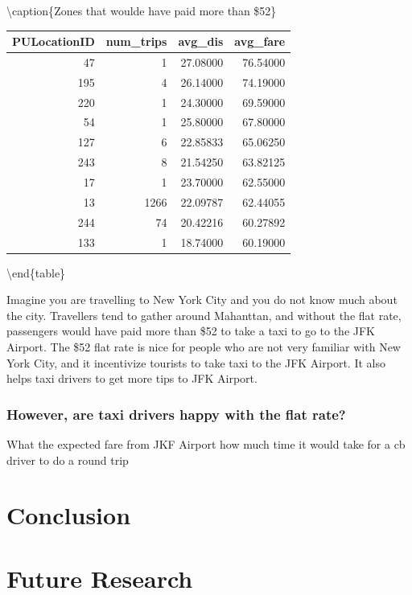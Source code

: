 \documentclass[12pt,twoside]{reedthesis}
\theoremstyle{definition}
\theoremstyle{definition}
\theoremstyle{definition}
\theoremstyle{remark}
\begin{document}
\textbackslash{}caption\{\label{tab:unnamed-chunk-23}Zones that woulde have
paid more than \$52\} \centering
\begin{tabular}[t]{r|r|r|r}
\hline
PULocationID & num\_trips & avg\_dis & avg\_fare\\
\hline
47 & 1 & 27.08000 & 76.54000\\
\hline
195 & 4 & 26.14000 & 74.19000\\
\hline
220 & 1 & 24.30000 & 69.59000\\
\hline
54 & 1 & 25.80000 & 67.80000\\
\hline
127 & 6 & 22.85833 & 65.06250\\
\hline
243 & 8 & 21.54250 & 63.82125\\
\hline
17 & 1 & 23.70000 & 62.55000\\
\hline
13 & 1266 & 22.09787 & 62.44055\\
\hline
244 & 74 & 20.42216 & 60.27892\\
\hline
133 & 1 & 18.74000 & 60.19000\\
\hline
\end{tabular}
\textbackslash{}end\{table\}

Imagine you are travelling to New York City and you do not know much
about the city. Travellers tend to gather around Mahanttan, and without
the flat rate, passengers would have paid more than \$52 to take a taxi
to go to the JFK Airport. The \$52 flat rate is nice for people who are
not very familiar with New York City, and it incentivize tourists to
take taxi to the JFK Airport. It also helps taxi drivers to get more
tips to JFK Airport.

\subsection{However, are taxi drivers happy with the flat
rate?}\label{however-are-taxi-drivers-happy-with-the-flat-rate}

What the expected fare from JKF Airport how much time it would take for
a cb driver to do a round trip

\chapter*{Conclusion}\label{conclusion}

\chapter{Future Research}\label{future-research}
\end{document}
